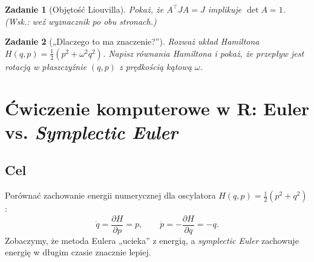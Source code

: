 \documentclass[12pt]{article}
\newtheorem{exer}{Zadanie}
\begin{document}
\begin{exer}[Objętość Liouvilla]
Pokaż, że $A^\top J A=J$ implikuje $\det A=1$. (Wsk.: weź wyznacznik po obu stronach.)
\end{exer}

\begin{exer}[„Dlaczego to ma znaczenie?”]
Rozważ układ Hamiltona $H(q,p)=\tfrac12(p^2+\omega^2 q^2)$. Napisz równania Hamiltona i pokaż, że przepływ jest rotacją w płaszczyźnie $(q,p)$ z prędkością kątową $\omega$.
\end{exer}

\section{Ćwiczenie komputerowe w R: Euler vs. \emph{Symplectic Euler}}
\subsection*{Cel}
Porównać zachowanie energii numerycznej dla oscylatora $H(q,p)=\tfrac12(p^2+q^2)$:
\[
\dot q = \frac{\partial H}{\partial p}=p,\qquad 
\dot p = -\frac{\partial H}{\partial q}=-q.
\]
Zobaczymy, że metoda Eulera „ucieka” z energią, a \emph{symplectic Euler} zachowuje energię w długim czasie znacznie lepiej.
\end{document}
